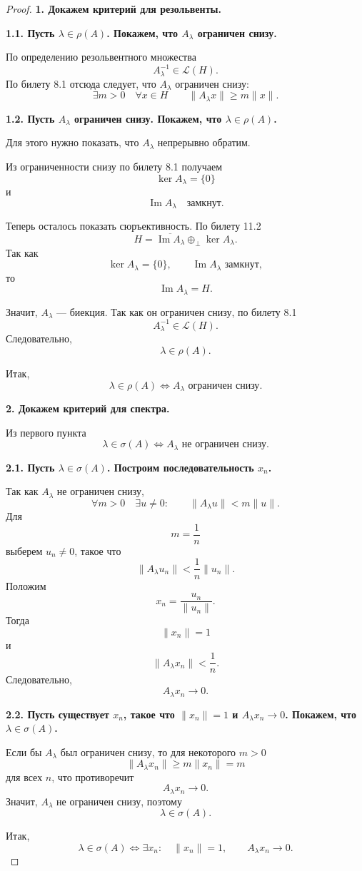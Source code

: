 \begin{proof}
	\textbf{1. Докажем критерий для резольвенты.}
	
	\textbf{1.1. Пусть \(\lambda\in\rho(A)\). Покажем, что \(A_\lambda\) ограничен снизу.}
	
	По определению резольвентного множества
	\[
	A_\lambda^{-1}\in\mathcal{L}(H).
	\]
	По билету 8.1 отсюда следует, что \(A_\lambda\) ограничен снизу:
	\[
	\exists m>0
	\quad
	\forall x\in H
	\qquad
	\|A_\lambda x\|\geqslant m\|x\|.
	\]
	
	\textbf{1.2. Пусть \(A_\lambda\) ограничен снизу. Покажем, что
		\(\lambda\in\rho(A)\).}
	
	Для этого нужно показать, что \(A_\lambda\) непрерывно обратим.
	
	Из ограниченности снизу по билету 8.1 получаем
	\[
	\ker A_\lambda=\{0\}
	\]
	и
	\[
	\operatorname{Im}A_\lambda
	\quad\text{замкнут}.
	\]
	
	Теперь осталось показать сюръективность. По билету 11.2
\[
H=
\overline{\operatorname{Im}A_\lambda}
\oplus_{\perp}
\ker A_\lambda.
\]
Так как
\[
\ker A_\lambda=\{0\},
\qquad
\operatorname{Im}A_\lambda
\text{ замкнут},
\]
то
\[
\operatorname{Im}A_\lambda=H.
\]
	
	Значит, \(A_\lambda\) --- биекция. Так как он ограничен снизу,
	по билету 8.1
	\[
	A_\lambda^{-1}\in\mathcal{L}(H).
	\]
	Следовательно,
	\[
	\lambda\in\rho(A).
	\]
	
	Итак,
	\[
	\boxed{
		\lambda\in\rho(A)
		\Longleftrightarrow
		A_\lambda\text{ ограничен снизу}.
	}
	\]
	
	\textbf{2. Докажем критерий для спектра.}
	
	Из первого пункта
	\[
	\lambda\in\sigma(A)
	\Longleftrightarrow
	A_\lambda\text{ не ограничен снизу}.
	\]
	
	\textbf{2.1. Пусть \(\lambda\in\sigma(A)\). Построим последовательность \(x_n\).}
	
	Так как \(A_\lambda\) не ограничен снизу,
	\[
	\forall m>0
	\quad
	\exists u\neq0:
	\qquad
	\|A_\lambda u\|<m\|u\|.
	\]
	Для
	\[
	m=\frac1n
	\]
	выберем \(u_n\neq0\), такое что
	\[
	\|A_\lambda u_n\|
	<
	\frac1n\|u_n\|.
	\]
	Положим
	\[
	x_n=\frac{u_n}{\|u_n\|}.
	\]
	Тогда
	\[
	\|x_n\|=1
	\]
	и
	\[
	\|A_\lambda x_n\|
	<
	\frac1n.
	\]
	Следовательно,
	\[
	A_\lambda x_n\to0.
	\]
	
	\textbf{2.2. Пусть существует \(x_n\), такое что
		\(\|x_n\|=1\) и \(A_\lambda x_n\to0\).
		Покажем, что \(\lambda\in\sigma(A)\).}
	
	Если бы \(A_\lambda\) был ограничен снизу, то для некоторого \(m>0\)
	\[
	\|A_\lambda x_n\|
	\geqslant
	m\|x_n\|
	=
	m
	\]
	для всех \(n\), что противоречит
	\[
	A_\lambda x_n\to0.
	\]
	Значит, \(A_\lambda\) не ограничен снизу, поэтому
	\[
	\lambda\in\sigma(A).
	\]
	
	Итак,
	\[
	\boxed{
		\lambda\in\sigma(A)
		\Longleftrightarrow
		\exists x_n:
		\quad
		\|x_n\|=1,
		\qquad
		A_\lambda x_n\to0.
	}
	\]
\end{proof}

